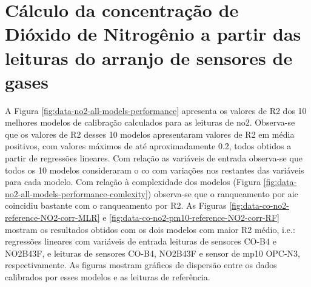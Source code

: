 \section{Cálculo da concentração de Dióxido de Nitrogênio a partir das leituras do arranjo de sensores de gases}

A Figura \ref{fig:data-no2-all-models-performance} apresenta os valores de R2 dos 10 melhores modelos de calibração calculados para as leituras de \acrshort{no2}. Observa-se que os valores de R2 desses 10 modelos apresentaram valores de R2 em média positivos, com valores máximos de até aproximadamente 0.2, todos obtidos a partir de regressões lineares. Com relação as variáveis de entrada observa-se que todos os 10 modelos consideraram o \acrshort{co} com variações nos restantes das variáveis para cada modelo. Com relação à complexidade dos modelos (Figura \ref{fig:data-no2-all-models-performance-comlexity}) observa-se que o ranqueamento por \acrshort{aic} coincidiu bastante com o ranqueamento por R2. As Figuras \ref{fig:data-co-no2-reference-NO2-corr-MLR} e \ref{fig:data-co-no2-pm10-reference-NO2-corr-RF} mostram os resultados obtidos com os dois modelos com maior R2 médio, i.e.: regressões lineares com variáveis de entrada leituras de sensores CO-B4 e NO2B43F, e leituras de sensores CO-B4, NO2B43F e sensor de \acrshort{mp10} OPC-N3, respectivamente. As figuras mostram gráficos de dispersão entre os dados calibrados por esses modelos e as leituras de referência.